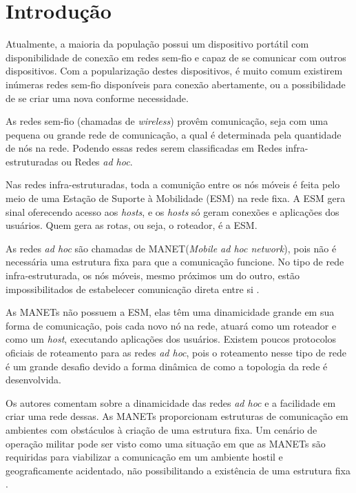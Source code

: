 \section{Introdu\c{c}\~ao} 
Atualmente, a maioria da popula\c{c}\~ao possui um dispositivo port\'atil com disponibilidade de conex\~ao em redes sem-fio e capaz de se comunicar com outros dispositivos. 
Com a populariza\c{c}\~ao destes dispositivos, \'e muito comum existirem in\'umeras redes sem-fio dispon\'iveis para conex\~ao abertamente, ou a possibilidade de se criar uma nova conforme necessidade.

As redes sem-fio (chamadas de \textit{wireless}) prov\^em comunica\c{c}\~ao, seja com uma pequena ou grande rede de comunica\c{c}\~ao, a qual \'e determinada pela quantidade de n\'os na rede. 
Podendo essas redes serem classificadas em Redes infra-estruturadas ou Redes \textit{ad hoc}.

Nas redes infra-estruturadas, toda a comuni\c{c}\~ao entre os n\'os m\'oveis \'e feita pelo meio de uma Esta\c{c}\~ao de Suporte \`a Mobilidade (ESM) na rede fixa.
A ESM gera sinal oferecendo acesso aos \textit{hosts}, e os \textit{hosts} s\'o geram conex\~oes e aplica\c{c}\~oes dos usu\'arios. 
Quem gera as rotas, ou seja, o roteador, \'e a ESM. 

As redes \textit{ad hoc} s\~ao chamadas de MANET(\textit{Mobile ad hoc network}), pois n\~ao \'e necess\'aria uma estrutura fixa para que a comunica\c{c}\~ao funcione.
No tipo de rede infra-estruturada, os n\'os m\'oveis, mesmo pr\'oximos um do outro, est\~ao impossibilitados de estabelecer comunica\c{c}\~ao direta entre si \cite{pereira}.

As MANETs n\~ao possuem a ESM, elas t\^em uma dinamicidade grande em sua forma de comunica\c{c}\~ao, pois cada novo n\'o na rede, atuar\'a como um roteador e como um \textit{host}, executando aplica\c{c}\~oes dos usu\'arios. 
Existem poucos protocolos oficiais de roteamento para as redes \textit{ad hoc}, pois  o roteamento nesse tipo de rede \'e um grande desafio devido a forma din\^ amica de como a topologia da rede \'e desenvolvida.

Os autores \cite{pepe} comentam sobre a dinamicidade das redes \textit{ad hoc} e a facilidade em criar uma rede dessas.
As MANETs proporcionam estruturas de comunica\c{c}\~ao em ambientes com obst\'aculos \`a cria\c{c}\~ao de uma estrutura fixa.
Um cen\'ario de opera\c{c}\~ao militar pode ser visto como uma situa\c{c}\~ao em que as MANETs s\~ao requiridas para viabilizar a comunica\c{c}\~ao em um ambiente hostil e geograficamente acidentado, n\~ao possibilitando a exist\^encia de uma estrutura fixa \cite{schimidt}.

